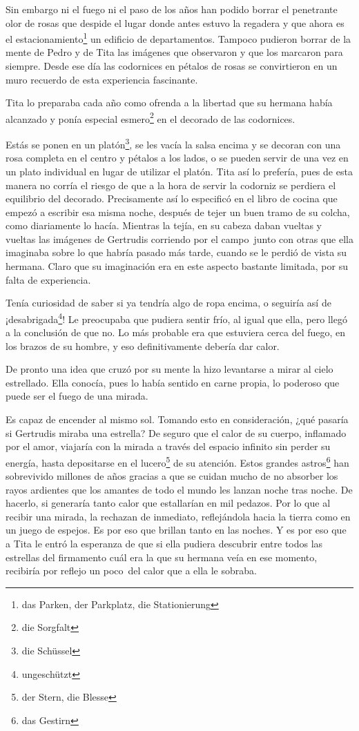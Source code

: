 Sin embargo ni el fuego ni el paso de los años han podido borrar el
penetrante olor de rosas que despide el lugar donde antes estuvo la
regadera y que ahora es el estacionamiento\footnote{das Parken, der Parkplatz, die Stationierung}
un edificio de departamentos.
Tampoco pudieron borrar de la mente de Pedro y de Tita las imágenes que
observaron y que los marcaron para siempre. Desde ese día las codornices
en pétalos de rosas se convirtieron en un muro recuerdo de esta
experiencia fascinante.

Tita lo preparaba cada año como ofrenda a la libertad que su hermana
había alcanzado y ponía especial esmero\footnote{die Sorgfalt}
en el decorado de las codornices.

Estás se ponen en un platón\footnote{die Schüssel}, se
les vacía la salsa encima y se
decoran con una rosa completa en el centro y pétalos a los lados, o se
pueden servir de una vez en un plato individual en lugar de utilizar el
platón. Tita así lo prefería, pues de esta manera no corría el riesgo de
que a la hora de servir la codorniz se perdiera el equilibrio del
decorado. Precisamente así lo especificó en el libro de cocina que
empezó a escribir esa misma noche, después de tejer un buen tramo de su
colcha, como diariamente lo hacía. Mientras la tejía, en su cabeza daban
vueltas y vueltas las imágenes de Gertrudis corriendo por el campo~junto con otras que ella imaginaba sobre lo que habría pasado más tarde,
cuando se le perdió de vista su hermana. Claro que su imaginación era en
este aspecto bastante limitada, por su falta de experiencia.

Tenía curiosidad de saber si ya tendría algo de ropa encima, o seguiría
así de \ndots ¡desabrigada\footnote{ungeschützt}! Le preocupaba
que pudiera sentir frío, al igual que ella, pero llegó a la conclusión de
que no. Lo más probable era que estuviera cerca del fuego, en los brazos
de su hombre, y eso definitivamente debería dar calor.

De pronto una idea que cruzó por su mente la hizo levantarse a mirar al
cielo estrellado. Ella conocía, pues lo había sentido en carne propia,
lo poderoso que puede ser el fuego de una mirada.

Es capaz de encender al mismo sol. Tomando esto en consideración, ¿qué
pasaría si Gertrudis miraba una estrella? De seguro que el calor de su
cuerpo, inflamado por el amor, viajaría con la mirada a través del
espacio infinito sin perder su energía, hasta depositarse en
el lucero\footnote{der Stern, die Blesse}
de su atención. Estos grandes astros\footnote{das Gestirn} han
sobrevivido millones de años gracias a que se cuidan mucho de no absorber
los rayos ardientes que los amantes de todo el mundo les lanzan noche
tras noche. De hacerlo, si generaría tanto calor que estallarían en mil
pedazos. Por lo que al recibir una mirada, la rechazan de inmediato,
reflejándola hacia la tierra como en un juego de espejos. Es por eso
que brillan tanto en las noches. Y es por eso que a Tita le entró la
esperanza de que si ella pudiera descubrir entre todos las estrellas del
firmamento cuál era la que su hermana veía en ese momento, recibiría
por reflejo un poco~del calor que a ella le sobraba.

